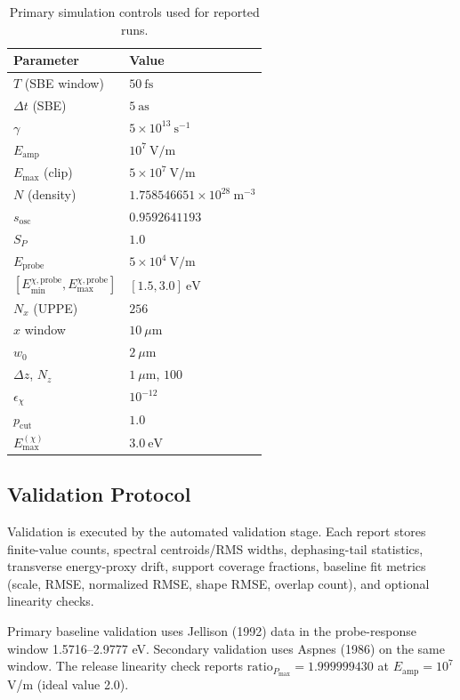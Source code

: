 \documentclass[aps,pra,twocolumn,reprint,superscriptaddress,nofootinbib]{revtex4-2}
\begin{document}
\begin{table}[t]
\centering
\caption{Primary simulation controls used for reported runs.}
\label{tab:numerical_controls}
\begin{tabular}{ll}
\toprule
Parameter & Value \\
\midrule
$T$ (SBE window) & $50~\mathrm{fs}$ \\
$\Delta t$ (SBE) & $5~\mathrm{as}$ \\
$\gamma$ & $5\times10^{13}~\mathrm{s^{-1}}$ \\
$E_{\mathrm{amp}}$ & $10^7~\mathrm{V/m}$ \\
$E_{\max}$ (clip) & $5\times10^7~\mathrm{V/m}$ \\
$N$ (density) & $1.758546651\times10^{28}~\mathrm{m^{-3}}$ \\
$s_{\mathrm{osc}}$ & $0.9592641193$ \\
$S_P$ & $1.0$ \\
$E_{\mathrm{probe}}$ & $5\times10^4~\mathrm{V/m}$ \\
$[E_{\min}^{\chi,\mathrm{probe}},E_{\max}^{\chi,\mathrm{probe}}]$ & $[1.5,3.0]~\mathrm{eV}$ \\
$N_x$ (UPPE) & $256$ \\
$x$ window & $10~\mu\mathrm{m}$ \\
$w_0$ & $2~\mu\mathrm{m}$ \\
$\Delta z$, $N_z$ & $1~\mu\mathrm{m}$, $100$ \\
$\epsilon_{\chi}$ & $10^{-12}$ \\
$p_{\mathrm{cut}}$ & $1.0$ \\
$E_{\max}^{(\chi)}$ & $3.0~\mathrm{eV}$ \\
\bottomrule
\end{tabular}
\end{table}

\subsection{Validation Protocol}
Validation is executed by the automated validation stage. Each report
stores finite-value counts, spectral centroids/RMS widths, dephasing-tail
statistics, transverse energy-proxy drift, support coverage fractions, baseline
fit metrics (scale, RMSE, normalized RMSE, shape RMSE, overlap count), and
optional linearity checks.

Primary baseline validation uses Jellison (1992) data in the probe-response
window 1.5716--2.9777 eV. Secondary validation uses Aspnes (1986) on the same
window. The release linearity check reports
$\mathrm{ratio}_{P_{\max}}=1.999999430$ at
$E_{\mathrm{amp}}=10^7$ V/m (ideal value 2.0).
\end{document}

